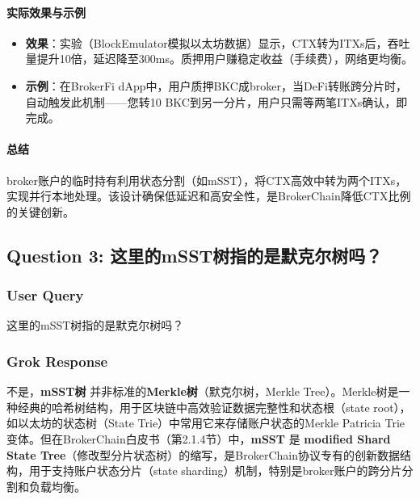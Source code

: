\documentclass[a4paper,12pt]{ctexart}
\begin{document}
\paragraph{实际效果与示例}
\begin{itemize}
  \item \textbf{效果}：实验（BlockEmulator模拟以太坊数据）显示，CTX转为ITXs后，吞吐量提升10倍，延迟降至300ms。质押用户赚稳定收益（手续费），网络更均衡。
  \item \textbf{示例}：在BrokerFi dApp中，用户质押BKC成broker，当DeFi转账跨分片时，自动触发此机制——您转10 BKC到另一分片，用户只需等两笔ITXs确认，即完成。
\end{itemize}

\paragraph*{总结}
broker账户的临时持有利用状态分割（如mSST），将CTX高效中转为两个ITXs，实现并行本地处理。该设计确保低延迟和高安全性，是BrokerChain降低CTX比例的关键创新。

\subsection*{Question 3: 这里的mSST树指的是默克尔树吗？}
\subsubsection*{User Query}
这里的mSST树指的是默克尔树吗？

\subsubsection*{Grok Response}
不是，\textbf{mSST树} 并非标准的\textbf{Merkle树}（默克尔树，Merkle Tree）。Merkle树是一种经典的哈希树结构，用于区块链中高效验证数据完整性和状态根（state root），如以太坊的状态树（State Trie）中常用它来存储账户状态的Merkle Patricia Trie变体。但在BrokerChain白皮书（第2.1.4节）中，\textbf{mSST} 是 \textbf{modified Shard State Tree}（修改型分片状态树）的缩写，是BrokerChain协议专有的创新数据结构，用于支持账户状态分片（state sharding）机制，特别是broker账户的跨分片分割和负载均衡。
\end{document}
